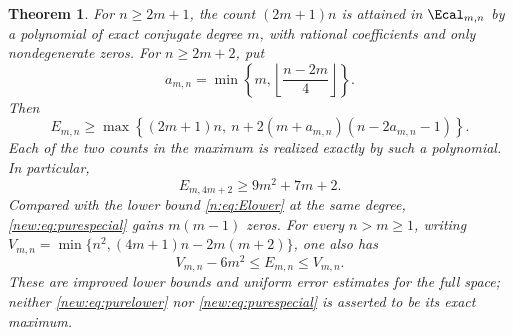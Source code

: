 \documentclass[UTF8,11pt]{ctexart}
\newtheorem{thm}{Theorem}[section]
\theoremstyle{definition}
\numberwithin{equation}{section}
\begin{document}
\begin{thm}\label{new:thm:pure}
For $n\ge2m+1$, the count $(2m+1)n$ is attained in $\Ecal_{m,n}$ by
a polynomial of exact conjugate degree $m$, with rational coefficients
and only nondegenerate zeros. For $n\ge2m+2$, put
\begin{equation}\label{new:eq:optimizer}
 a_{m,n}=\min\left\{m,\left\lfloor\frac{n-2m}{4}\right\rfloor\right\}.
\end{equation}
Then
\begin{equation}\label{new:eq:purelower}
 E_{m,n}\ge\max\left\{(2m+1)n,\
 n+2(m+a_{m,n})(n-2a_{m,n}-1)\right\}.
\end{equation}
Each of the two counts in the maximum is realized exactly by such a
polynomial. In particular,
\begin{equation}\label{new:eq:purespecial}
 E_{m,4m+2}\ge9m^2+7m+2.
\end{equation}
Compared with the lower bound \eqref{n:eq:Elower} at the same degree,
\eqref{new:eq:purespecial} gains $m(m-1)$ zeros.
For every $n>m\ge1$, writing
$V_{m,n}=\min\{n^2,(4m+1)n-2m(m+2)\}$, one also has
\begin{equation}\label{new:eq:uniformpure}
 V_{m,n}-6m^2\le E_{m,n}\le V_{m,n}.
\end{equation}
These are improved lower bounds and uniform error estimates for the
full space; neither \eqref{new:eq:purelower} nor
\eqref{new:eq:purespecial} is asserted to be its exact maximum.
\end{thm}
\end{document}

